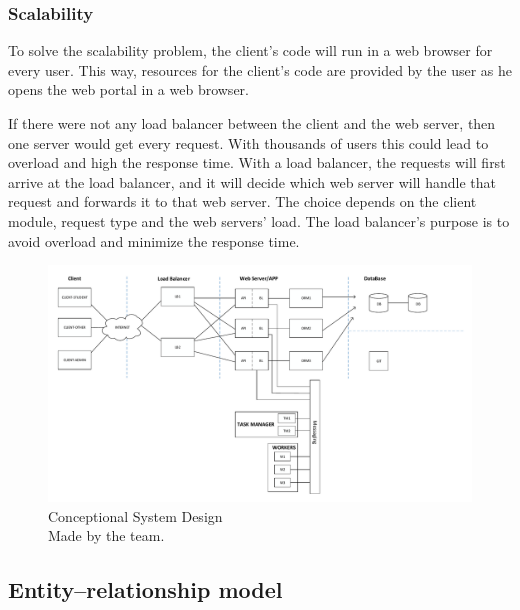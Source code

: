 \subsubsection{Scalability}


To solve the scalability problem, the client's code will run in a web browser for every user. This way, resources for the client's code are provided by the user as he opens the web portal in a web browser.
 

If there were not any load balancer between the client and the web server, then one server would get every request. With thousands of users this could lead to overload and high the response time. With a load balancer, the requests will first arrive at the load balancer, and it will decide which web server will handle that request and forwards it to that web server. The choice depends on the client module, request type and the web servers' load. The load balancer's purpose is to avoid overload and minimize the response time.
 
 \begin{figure}[!htbp]
 	\includegraphics[width=0.95\textheight, angle=90]{figures/atfogo_rendszerterv_teljes.pdf}
 	\caption[Conceptional System Design]{Conceptional System Design\\Made by the team.}
 	\label{fig:conceptional-system-design}
 \end{figure}
 
 
 \newpage
\subsection{Entity–relationship model}
\label{ER-model}

